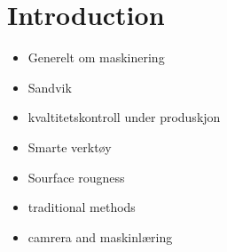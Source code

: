\chapter{Introduction}

\begin{itemize}
    \item Generelt om maskinering
    \item Sandvik
    \item kvaltitetskontroll under produskjon
    \item Smarte verktøy
    \item Sourface rougness
    \item traditional methods
    \item camrera and maskinlæring
\end{itemize}
